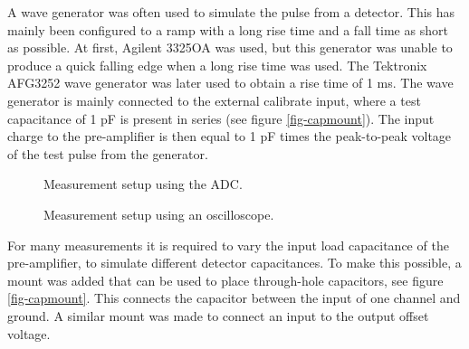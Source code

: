\documentclass[../main/thesis.tex]{subfiles}
\begin{document}
A wave generator was often used to simulate the pulse from a detector. This has mainly been configured to a ramp with a long rise time and a fall time as short as possible. At first, Agilent 3325OA was used, but this generator was unable to produce a quick falling edge when a long rise time was used. The Tektronix AFG3252 wave generator was later used to obtain a rise time of 1 ms. The wave generator is mainly connected to the external calibrate input, where a test capacitance of 1 pF is present in series (see figure \ref{fig-capmount}). The input charge to the pre-amplifier is then equal to 1 pF times the peak-to-peak voltage of the test pulse from the generator. 

\begin{figure}
\centering
{}
\caption{Measurement setup using the ADC.}
\label{fig-setup-adc}
\end{figure}

\begin{figure}
	\centering
	\caption{Measurement setup using an oscilloscope.}
	\label{fig-setup-scope}
\end{figure}

For many measurements it is required to vary the input load capacitance of the pre-amplifier, to simulate different detector capacitances. To make this possible, a mount was added that can be used to place through-hole capacitors, see figure \ref{fig-capmount}. This connects the capacitor between the input of one channel and ground. A similar mount was made to connect an input to the output offset voltage.
\end{document}
